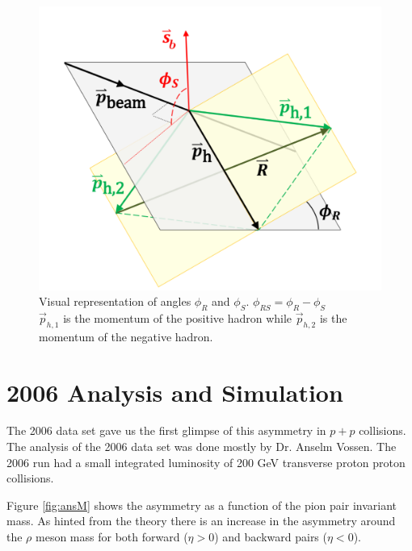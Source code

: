 \documentclass[abstract = on,listof=totoc, bibliography=totoc]{scrreprt}
\newcommand{\phir}{\phi_{R}}
\newcommand{\phis}{\phi_{S}}
\begin{document}
\begin{figure}
\begin{center}
\includegraphics[width = 1\textwidth]{IFF_frame_edit2}
\caption[Angles $\phis$ and $\phir$]{Visual representation of angles $\phi_R$ and $\phi_S$. $\phi_{RS} = \phi_R - \phi_S$ \\ $\vec{p}_{h,1}$ is the momentum of the positive hadron while  $\vec{p}_{h,2}$ is the momentum of the negative hadron.}
\label{fig:angleDeff}
\end{center}
\end{figure}




\chapter{2006 Analysis and Simulation}
\label{chap:2006}

The 2006 data set gave us the first glimpse of this asymmetry in $p+p$ collisions. The analysis of the 2006 data set was done mostly by Dr. Anselm Vossen. The 2006 run had a small integrated luminosity of 200 GeV transverse proton proton collisions.

Figure \ref{fig:ansM} shows the asymmetry as a function of the pion pair invariant mass. As hinted from the theory there is an increase in the asymmetry around the $\rho$ meson mass for both forward ($\eta > 0$) and backward pairs ($\eta < 0$). 
\end{document}
